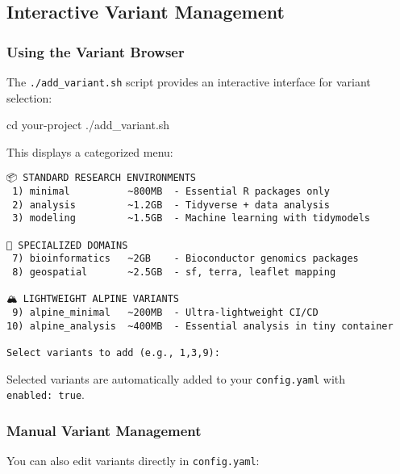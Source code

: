\documentclass[
]{article}
\newenvironment{Shaded}{\begin{snugshade}}{\end{snugshade}}
\newcommand{\BuiltInTok}[1]{#1}
\newcommand{\ExtensionTok}[1]{#1}
\newcommand{\NormalTok}[1]{#1}
\begin{document}
\subsection{Interactive Variant
Management}\label{interactive-variant-management}

\subsubsection{Using the Variant
Browser}\label{using-the-variant-browser}

The \texttt{./add\_variant.sh} script provides an interactive interface
for variant selection:

\begin{Shaded}
\begin{Highlighting}[]
\BuiltInTok{cd}\NormalTok{ your{-}project}
\ExtensionTok{./add\_variant.sh}
\end{Highlighting}
\end{Shaded}

This displays a categorized menu:

\begin{verbatim}
📦 STANDARD RESEARCH ENVIRONMENTS
 1) minimal          ~800MB  - Essential R packages only
 2) analysis         ~1.2GB  - Tidyverse + data analysis
 3) modeling         ~1.5GB  - Machine learning with tidymodels

🔬 SPECIALIZED DOMAINS
 7) bioinformatics   ~2GB    - Bioconductor genomics packages
 8) geospatial       ~2.5GB  - sf, terra, leaflet mapping

🏔️ LIGHTWEIGHT ALPINE VARIANTS
 9) alpine_minimal   ~200MB  - Ultra-lightweight CI/CD
10) alpine_analysis  ~400MB  - Essential analysis in tiny container

Select variants to add (e.g., 1,3,9):
\end{verbatim}

Selected variants are automatically added to your \texttt{config.yaml}
with \texttt{enabled:\ true}.

\subsubsection{Manual Variant
Management}\label{manual-variant-management}

You can also edit variants directly in \texttt{config.yaml}:
\end{document}
